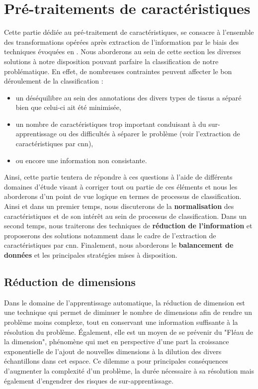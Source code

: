 \clearpage


\section{Pré-traitements de caractéristiques}
Cette partie dédiée au pré-traitement de caractéristiques, se consacre à l'ensemble des transformations opérées après extraction de l'information par le biais des techniques évoquées en . Nous aborderons au sein de cette section les diverses solutions à notre disposition pouvant parfaire la classification de notre problématique. En effet, de nombreuses contraintes peuvent affecter le bon déroulement de la classification :
\begin{itemize}
    \item un déséquilibre au sein des annotations des divers types de tissus a séparé bien que celui-ci ait été minimisée,
    \item un nombre de caractéristiques trop important conduisant à du sur-apprentissage ou des difficultés à séparer le problème (voir l'extraction de caractéristiques par \gls{cnn}),
    \item ou encore une information non consistante.
\end{itemize}\par

Ainsi, cette partie tentera de répondre à ces questions à l'aide de différents domaines d'étude visant à corriger tout ou partie de ces éléments et nous les aborderons d'un point de vue logique en termes de processus de classification. Ainsi et dans un premier temps, nous discuterons de la \textbf{normalisation} des caractéristiques et de son intérêt au sein de processus de classification. Dans un second temps, nous traiterons des techniques de \textbf{réduction de l'information} et proposerons des solutions notamment dans le cadre de l'extraction de caractéristiques par \gls{cnn}. Finalement, nous aborderons le \textbf{balancement de données} et les principales stratégies mises à disposition.

\subsection{Réduction de dimensions}
Dans le domaine de l'apprentissage automatique, la réduction de dimension est une technique qui permet de diminuer le nombre de dimensions afin de rendre un problème moins complexe, tout en conservant une information suffisante à la résolution du problème. Également, elle est un moyen de se prévenir du "Fléau de la dimension", phénomène qui met en perspective d'une part la croissance exponentielle de l'ajout de nouvelles dimensions à la dilution des divers échantillons dans cet espace. Ce dilemme a pour principales conséquences d'augmenter la complexité d'un problème, la durée nécessaire à sa résolution mais également d'engendrer des risques de sur-apprentissage.\par

